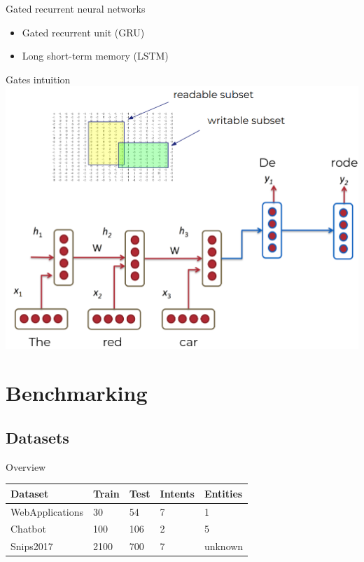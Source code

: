 \documentclass[pdf]{beamer}
\newcommand{\entity}[1]{\textcolor{ao(english)}{#1}}
\newcommand{\intent}[1]{\textcolor{azure(colorwheel)}{#1}}
\begin{document}
    \begin{frame}{Gated recurrent neural networks}
      \begin{itemize}
      \item Gated recurrent unit (GRU) \\[3mm]
        \item Long short-term memory (LSTM)
      \end{itemize}
    \end{frame}
    
    \begin{frame}{Gates intuition}
        \includegraphics[height=0.9\textheight]{figures/gru.png}
    \end{frame}

    \section{Benchmarking}
    \subsection{Datasets}
    \begin{frame}{Overview}
        \begin{tabular}{l l l l l}
            \textbf{Dataset} & \textbf{Train} & \textbf{Test} & \textbf{\intent{Intents}} & \textbf{\entity{Entities}}\\
            \hline
            WebApplications & 30 & 54 & 7 & 1\\

            Chatbot & 100 & 106 & 2 & 5\\
            Snips2017 & 2100 & 700 & 7 & unknown\\
        \end{tabular}
    \end{frame}
\end{document}
